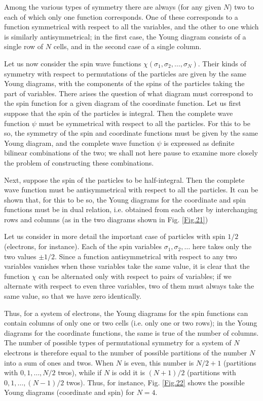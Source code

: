 Among the various types of symmetry there are always (for any given $ N $) two to each of which only one function corresponds. One of these corresponds to a function symmetrical with respect to all the variables, and the other to one which is similarly antisymmetrical; in the first case, the Young diagram consists of a single row of $ N $ cells, and in the second case of a single column.

Let us now consider the spin wave functions $ \chi(\sigma_1, \sigma_2, \dots, \sigma_N) $. Their kinds of symmetry with respect to permutations of the particles are given by the same Young diagrams, with the components of the spins of the particles taking the part of variables. There arises the question of what diagram must correspond to the spin function for a given diagram of the coordinate function. Let us first suppose that the spin of the particles is integral. Then the complete wave function $\psi$ must be symmetrical with respect to all the particles. For this to be so, the symmetry of the spin and coordinate functions must be given by the same Young diagram, and the complete wave function $\psi$ is expressed as definite bilinear combinations of the two; we shall not here pause to examine more closely the problem of constructing these combinations.

Next, suppose the spin of the particles to be half-integral. Then the complete wave function must be antisymmetrical with respect to all the particles. It can be shown that, for this to be so, the Young diagrams for the coordinate and spin functions must be in dual relation, i.e. obtained from each other by interchanging rows and columns (as in the two diagrams shown in Fig. \ref{Fig.21})

Let us consider in more detail the important case of particles with spin $ 1/2 $ (electrons, for instance). Each of the spin variables $ \sigma_1, \sigma_2, \dots $ here takes only the two values $ \pm1/2 $. Since a function antisymmetrical with respect to any two variables vanishes when these variables take the same value, it is clear that the function $\chi$ can be alternated only with respect to pairs of variables; if we alternate with respect to even three variables, two of them must always take the same value, so that we have zero identically.

Thus, for a system of electrons, the Young diagrams for the spin functions can contain columns of only one or two cells (i.e. only one or two rows); in the Young diagrams for the coordinate functions, the same is true of the number of columns. The number of possible types of permutational symmetry for a system of $ N $ electrons is therefore equal to the number of possible partitions of the number $ N $ into a sum of ones and twos. When $ N $ is even, this number is $ N/2+1 $ (partitions with $ 0, 1, \dots, N/2 $ twos), while if $ N $ is odd it is $ (N+1)/2 $ (partitions with $ 0, 1, \dots, (N-1)/2 $ twos). Thus, for instance, Fig. \ref{Fig.22} shows the possible Young diagrams (coordinate and spin) for $ N = 4 $.








